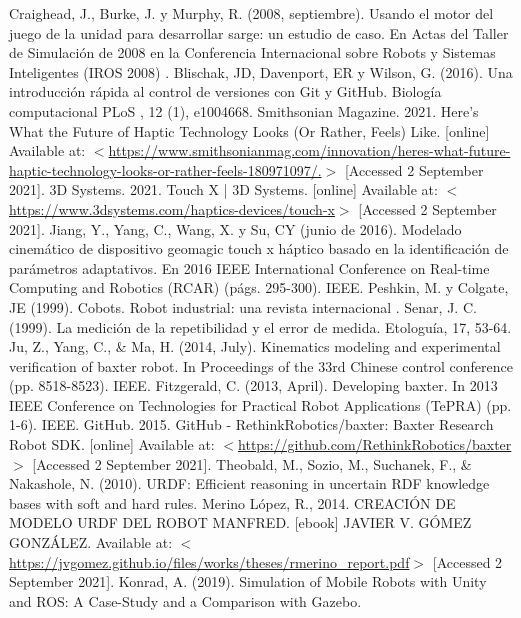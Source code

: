 \begin{thebibliography}{2}
	 Craighead, J., Burke, J. y Murphy, R. (2008, septiembre). Usando el motor del juego de la unidad para desarrollar sarge: un estudio de caso. En Actas del Taller de Simulación de 2008 en la Conferencia Internacional sobre Robots y Sistemas Inteligentes (IROS 2008) .
	 Blischak, JD, Davenport, ER y Wilson, G. (2016). Una introducción rápida al control de versiones con Git y GitHub. Biología computacional PLoS , 12 (1), e1004668.
	 Smithsonian Magazine. 2021. Here's What the Future of Haptic Technology Looks (Or Rather, Feels) Like. [online] Available at: $<$\href{https://www.smithsonianmag.com/innovation/heres-what-future-haptic-technology-looks-or-rather-feels-180971097/}{https://www.smithsonianmag.com/innovation/heres-what-future-haptic-technology-looks-or-rather-feels-180971097/.}$>$ [Accessed 2 September 2021].
	 3D Systems. 2021. Touch X | 3D Systems. [online] Available at: $<$\url{https://www.3dsystems.com/haptics-devices/touch-x}$>$ [Accessed 2 September 2021].
	 Jiang, Y., Yang, C., Wang, X. y Su, CY (junio de 2016). Modelado cinemático de dispositivo geomagic touch x háptico basado en la identificación de parámetros adaptativos. En 2016 IEEE International Conference on Real-time Computing and Robotics (RCAR) (págs. 295-300). IEEE.
	 Peshkin, M. y Colgate, JE (1999). Cobots. Robot industrial: una revista internacional .
	 Senar, J. C. (1999). La medición de la repetibilidad y el error de medida. Etologuía, 17, 53-64.
	 Ju, Z., Yang, C., \& Ma, H. (2014, July). Kinematics modeling and experimental verification of baxter robot. In Proceedings of the 33rd Chinese control conference (pp. 8518-8523). IEEE.
	 Fitzgerald, C. (2013, April). Developing baxter. In 2013 IEEE Conference on Technologies for Practical Robot Applications (TePRA) (pp. 1-6). IEEE.
	 GitHub. 2015. GitHub - RethinkRobotics/baxter: Baxter Research Robot SDK. [online] Available at: $<$\url{https://github.com/RethinkRobotics/baxter}$>$ [Accessed 2 September 2021].
	 Theobald, M., Sozio, M., Suchanek, F., \& Nakashole, N. (2010). URDF: Efficient reasoning in uncertain RDF knowledge bases with soft and hard rules.
	 Merino López, R., 2014. CREACIÓN DE MODELO URDF DEL ROBOT MANFRED. [ebook] JAVIER V. GÓMEZ GONZÁLEZ. Available at: $<$\url{https://jvgomez.github.io/files/works/theses/rmerino\_report.pdf}$>$ [Accessed 2 September 2021].
	 Konrad, A. (2019). Simulation of Mobile Robots with Unity and ROS: A Case-Study and a Comparison with Gazebo.

\end{thebibliography}
